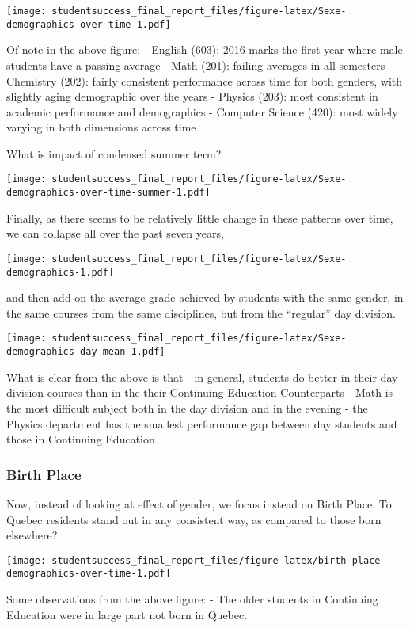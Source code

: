 \documentclass[]{book}
\theoremstyle{definition}
\theoremstyle{definition}
\theoremstyle{remark}
\begin{document}
\texttt{[image: studentsuccess\_final\_report\_files/figure-latex/Sexe-demographics-over-time-1.pdf]}

Of note in the above figure: - English (603): 2016 marks the first year
where male students have a passing average - Math (201): failing
averages in all semesters - Chemistry (202): fairly consistent
performance across time for both genders, with slightly aging
demographic over the years - Physics (203): most consistent in academic
performance and demographics - Computer Science (420): most widely
varying in both dimensions across time

What is impact of condensed summer term?

\texttt{[image: studentsuccess\_final\_report\_files/figure-latex/Sexe-demographics-over-time-summer-1.pdf]}

Finally, as there seems to be relatively little change in these patterns
over time, we can collapse all over the past seven years,

\texttt{[image: studentsuccess\_final\_report\_files/figure-latex/Sexe-demographics-1.pdf]}

and then add on the average grade achieved by students with the same
gender, in the same courses from the same disciplines, but from the
``regular'' day division.

\texttt{[image: studentsuccess\_final\_report\_files/figure-latex/Sexe-demographics-day-mean-1.pdf]}

What is clear from the above is that - in general, students do better in
their day division courses than in the their Continuing Education
Counterparts - Math is the most difficult subject both in the day
division and in the evening - the Physics department has the smallest
performance gap between day students and those in Continuing Education

\subsubsection{Birth Place}\label{birth-place}

Now, instead of looking at effect of gender, we focus instead on Birth
Place. To Quebec residents stand out in any consistent way, as compared
to those born elsewhere?

\texttt{[image: studentsuccess\_final\_report\_files/figure-latex/birth-place-demographics-over-time-1.pdf]}

Some observations from the above figure: - The older students in
Continuing Education were in large part not born in Quebec.
\end{document}
